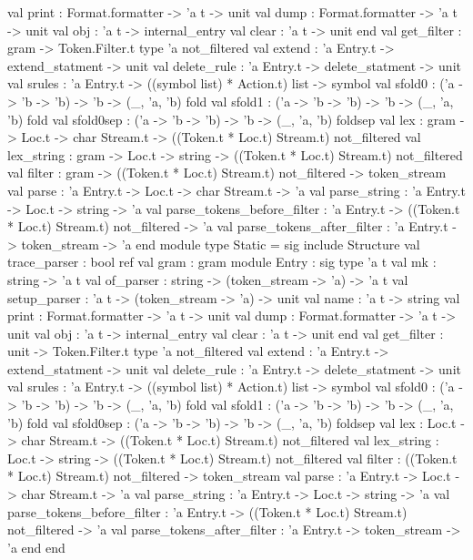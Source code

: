 \begin{description}
\begin{ocamlcode}
            val print : Format.formatter -> 'a t -> unit
            val dump : Format.formatter -> 'a t -> unit
            val obj : 'a t -> internal_entry
            val clear : 'a t -> unit
          end
        val get_filter : gram -> Token.Filter.t
        type 'a not_filtered
        val extend : 'a Entry.t -> extend_statment -> unit
        val delete_rule : 'a Entry.t -> delete_statment -> unit
        val srules : 'a Entry.t -> ((symbol list) * Action.t) list -> symbol
        val sfold0 : ('a -> 'b -> 'b) -> 'b -> (_, 'a, 'b) fold
        val sfold1 : ('a -> 'b -> 'b) -> 'b -> (_, 'a, 'b) fold
        val sfold0sep : ('a -> 'b -> 'b) -> 'b -> (_, 'a, 'b) foldsep
        val lex :
          gram ->
            Loc.t ->
              char Stream.t -> ((Token.t * Loc.t) Stream.t) not_filtered
        val lex_string :
          gram ->
            Loc.t -> string -> ((Token.t * Loc.t) Stream.t) not_filtered
        val filter :
          gram -> ((Token.t * Loc.t) Stream.t) not_filtered -> token_stream
        val parse : 'a Entry.t -> Loc.t -> char Stream.t -> 'a
        val parse_string : 'a Entry.t -> Loc.t -> string -> 'a
        val parse_tokens_before_filter :
          'a Entry.t -> ((Token.t * Loc.t) Stream.t) not_filtered -> 'a
        val parse_tokens_after_filter : 'a Entry.t -> token_stream -> 'a
      end
    module type Static =
      sig
        include Structure
        val trace_parser : bool ref
        val gram : gram
        module Entry :
          sig
            type 'a t
            val mk : string -> 'a t
            val of_parser : string -> (token_stream -> 'a) -> 'a t
            val setup_parser : 'a t -> (token_stream -> 'a) -> unit
            val name : 'a t -> string
            val print : Format.formatter -> 'a t -> unit
            val dump : Format.formatter -> 'a t -> unit
            val obj : 'a t -> internal_entry
            val clear : 'a t -> unit
          end
        val get_filter : unit -> Token.Filter.t
        type 'a not_filtered
        val extend : 'a Entry.t -> extend_statment -> unit
        val delete_rule : 'a Entry.t -> delete_statment -> unit
        val srules : 'a Entry.t -> ((symbol list) * Action.t) list -> symbol
        val sfold0 : ('a -> 'b -> 'b) -> 'b -> (_, 'a, 'b) fold
        val sfold1 : ('a -> 'b -> 'b) -> 'b -> (_, 'a, 'b) fold
        val sfold0sep : ('a -> 'b -> 'b) -> 'b -> (_, 'a, 'b) foldsep
        val lex :
          Loc.t -> char Stream.t -> ((Token.t * Loc.t) Stream.t) not_filtered
        val lex_string :
          Loc.t -> string -> ((Token.t * Loc.t) Stream.t) not_filtered
        val filter :
          ((Token.t * Loc.t) Stream.t) not_filtered -> token_stream
        val parse : 'a Entry.t -> Loc.t -> char Stream.t -> 'a
        val parse_string : 'a Entry.t -> Loc.t -> string -> 'a
        val parse_tokens_before_filter :
          'a Entry.t -> ((Token.t * Loc.t) Stream.t) not_filtered -> 'a
        val parse_tokens_after_filter : 'a Entry.t -> token_stream -> 'a
      end
  end
\end{ocamlcode}


\end{description}
